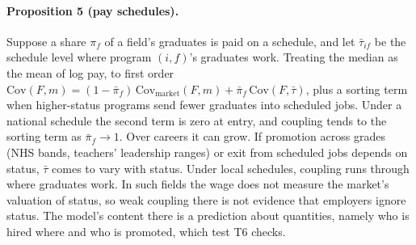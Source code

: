 \paragraph{Proposition 5 (pay schedules).} Suppose a share $\pi_f$ of a field's graduates is paid on a schedule,
and let $\bar\tau_{if}$ be the schedule level where program $(i,f)$'s graduates work. Treating the median as the
mean of log pay, to first order $\mathrm{Cov}(F,m)=(1-\bar\pi_f)\,\mathrm{Cov}_{\text{market}}(F,m)+\bar\pi_f\,
\mathrm{Cov}(F,\bar\tau)$, plus a sorting term when higher-status programs send fewer graduates into scheduled
jobs. Under a national schedule the second term is zero at entry, and coupling tends to the sorting term as
$\bar\pi_f\to1$. Over careers it can grow. If promotion across grades (NHS bands, teachers' leadership ranges)
or exit from scheduled jobs depends on status, $\bar\tau$ comes to vary with status. Under local schedules,
coupling runs through where graduates work. In such fields the wage does not measure the market's valuation of
status, so weak coupling there is not evidence that employers ignore status. The model's content there is a
prediction about quantities, namely who is hired where and who is promoted, which test T6 checks.

